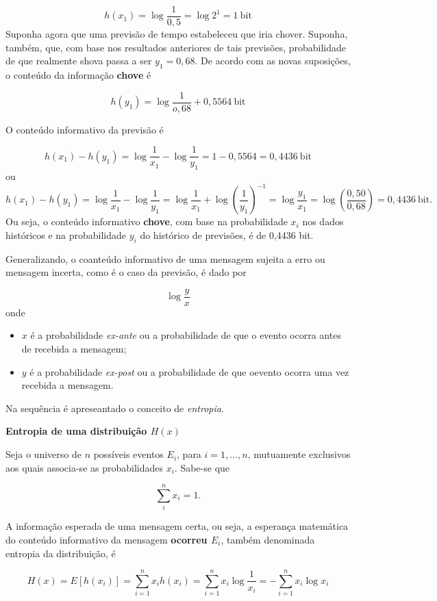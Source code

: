 \documentclass[
]{book}
\begin{document}
\[
  h(x_1) = \log\dfrac{1}{0,5} =\log 2^1 = 1~\text{bit}
\]
Suponha agora que uma previsão de tempo estabeleceu que iria chover. Suponha, também, que, com base nos resultados anteriores de tais previsões, probabilidade de que realmente shova passa a ser \(y_1 = 0,68\). De acordo com as novas suposições, o conteúdo da informação \textbf{chove} é

\[
  h(y_1) = \log\dfrac{1}{o,68} + 0,5564~\text{bit}
\]

O conteúdo informativo da previsão é

\[
  h(x_1) - h(y_1) = \log\dfrac{1}{x_1} - \log\dfrac{1}{y_1} =  1 - 0,5564 = 0,4436~\text{bit}
\]
ou
\[
  h(x_1) - h(y_1) = \log\dfrac{1}{x_1} - \log\dfrac{1}{y_1} = \log\dfrac{1}{x_1} + \log \left(\dfrac{1}{y_1}\right)^{-1} = \log\dfrac{y_1}{x_1} = \log\left(\dfrac{0,50}{0,68}\right)  = 0,4436~\text{bit}.
\]
Ou seja, o conteúdo informativo \textbf{chove}, com base na probabilidade \(x_i\) nos dados históricos e na probabilidade \(y_i\) do histórico de previsões, é de 0,4436 bit.

Generalizando, o coanteúdo informativo de uma mensagem sujeita a erro ou mensagem incerta, como é o caso da previsão, é dado por

\[
  \log \dfrac{y}{x}
  \label{eq:ConteudoInformativoGeral}
\]
onde

\begin{itemize}
\item
  \(x\) é a probabilidade \emph{ex-ante} ou a probabilidade de que o evento ocorra antes de recebida a mensagem;
\item
  \(y\) é a probabilidade \emph{ex-post} ou a probabilidade de que oevento ocorra uma vez recebida a mensagem.
\end{itemize}

Na sequência é apreseantado o conceito de \emph{entropia}.

\textbf{Entropia de uma distribuição \(H(x)\)}

Seja o universo de \(n\) possíveis eventos \(E_i\), para \(i=1,\ldots ,n\), mutuamente exclusivos aos quais associa-se as probabilidades \(x_i\). Sabe-se que

\[
  \sum_{i}^{n} x_i = 1.
\]

A informação esperada de uma mensagem certa, ou seja, a esperança matemática do conteúdo informativo da mensagem \textbf{ocorreu \(E_i\)}, também denominada entropia da distribuição, é

\[
  H(x) = E[h(x_i)] = \sum_{i=1}^{n} x_i h(x_i) = \sum_{i=1}^{n}x_i \log\dfrac{1}{x_i} = - \sum_{i=1}^{n}x_i \log x_i
  \label{eq:InformacaoEsperadaDeUmaMensagemCerta}
\]
\end{document}
